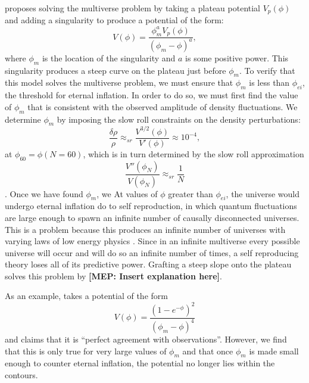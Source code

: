 \documentclass[a4paper,11pt]{article}
\newcommand{\mep}[1]{{\color{applegreen} \textbf{[MEP:  #1]}}}
\begin{document}
\citet{Mukhanov2014} proposes solving the multiverse problem by taking a plateau potential $V_p(\phi)$ and adding a singularity to produce a potential of the form:
\begin{equation}
V(\phi)=\frac{\phi_m^aV_p(\phi)}{(\phi_m-\phi)^a},
\label{eqn:MukhanovGeneral}
\end{equation}
where $\phi_m$ is the location of the singularity and $a$ is some positive power. This singularity produces a steep curve on the plateau just before $\phi_m$. To verify that this model solves the multiverse problem, we must ensure that $\phi_m$ is less than $\phi_{ei}$, the threshold for eternal inflation. In order to do so, we must first find the value of $\phi_m$ that is consistent with the observed amplitude of density fluctuations. We determine $\phi_m$ by imposing the slow roll constraints on the density perturbations:
\begin{equation}
\frac{\delta\rho}{\rho} \approx_{sr} \frac{V^{3/2}(\phi)}{V'(\phi)} \approx 10^{-4},
\end{equation}
at $\phi_{60}=\phi(N=60)$, which is in turn determined by the slow roll approximation 
\begin{equation}
\frac{V''(\phi_N)}{V(\phi_N)} \approx_{sr} \frac{1}{N}
\end{equation}
\citep{MukhanovBook2005}. Once we have found $\phi_m$, we At values of $\phi$ greater than $\phi_{ei}$, the universe would undergo eternal inflation do to self reproduction, in which quantum fluctuations are large enough to spawn an infinite number of causally disconnected universes. This is a problem because this produces an infinite number of universes with varying laws of low energy physics \citep{Linde2008,Linde1986}. Since in an infinite multiverse every possible universe will occur and will do so an infinite number of times, a self reproducing theory loses all of its predictive power. Grafting a steep slope onto the plateau solves this problem by \mep{Insert explanation here}. 

As an example, \citet{Mukhanov2014} takes a potential of the form
\begin{equation}
V(\phi)=\frac{(1-e^{-\phi})^2}{(\phi_m-\phi)^4}
\label{eqn:MukhanovExp}
\end{equation}
and claims that it is ``perfect agreement with observations''. However, we find that this is only true for very large values of $\phi_m$ and that once $\phi_m$ is made small enough to counter eternal inflation, the potential no longer lies within the \citet{Planck2015} contours. 
\end{document}
